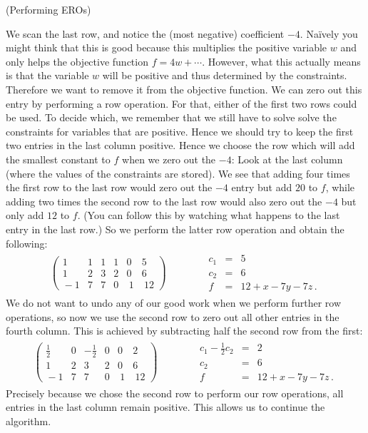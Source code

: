 \begin{example} (Performing EROs)

We scan the last row, and notice the (most negative) coefficient $-4$. Na\"ively
you might think that this is good because this multiplies the positive variable $w$
and only helps the objective function $f=4w+\cdots$. However, what this actually means
is that the variable $w$ will be positive and thus determined by the constraints. Therefore we want to remove it 
from the objective function. We can zero out this entry by performing a row operation. For that, either of the first two rows could be used. 
To decide which, we remember that  we still have to solve solve the constraints for variables that are positive. Hence we should try 
to keep the first two entries in the last column positive. Hence 
we choose the row which will add the smallest constant to $f$ when we zero out the $-4$: Look at the last column (where the values of the constraints are stored). We see that adding four times the 
first row to the last row would zero out the $-4$ entry but add $20$ to $f$, while adding two  times the second row to the last row would also zero out the $-4$ but only add $12$ to $f$. (You can follow this by watching what happens to the last entry in the last row.)
So we perform the latter row operation and obtain the following:
\[
\begin{array}{c|c}
\left(
\begin{array}{rrrrr|r}
1&1&1&1&0&5\\[1mm]
1&2&3&2&0&6\\\hline
\!-1&7&7&0&\ 1&\ 12
\end{array}\right)
\quad\quad  &\quad 
\begin{array}{rcl}
c_1&=&5\\[1mm]
c_2&=&6\\
f&=&12+x-7y-7z\, .
\end{array}
\end{array}
\]
We do not want to undo any of our good work when we perform further row operations, so now we use the second row to zero out all other entries in the fourth column. This is achieved by subtracting half the second row from the first:
\[
\begin{array}{c|c}
\left(
\begin{array}{rrrrr|r}
\frac12&0&-\frac12&0&0&2\\[1mm]
1&2&3&2&0&6\\\hline
\!-1&7&7&0&\ 1&\ 12
\end{array}\right)
\quad\quad  &\quad 
\begin{array}{rcl}
c_1-\frac12 c_2&=&2\\[1mm]
c_2&=&6\\
f&=&12+x-7y-7z\, .
\end{array}
\end{array}
\]
Precisely because we chose the second row to perform our row operations, all entries in the last column remain positive. This allows us to continue the algorithm.


\end{example}
